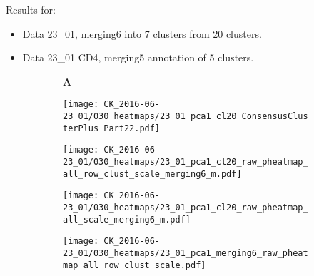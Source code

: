 \documentclass[a4paper, 12pt]{article}
\begin{document}
\pagestyle{empty}

Results for:
\begin{itemize}
  \item Data 23\_01, merging6 into 7 clusters from 20 clusters. 
  \item Data 23\_01 CD4, merging5 annotation of 5 clusters.
\end{itemize}


\begin{figure}[!thb]
\centering

    \caption{Data 23\_01, merging6 - 7 clusters}
    \begin{subfigure}[t]{0.02\textwidth}
    \vskip 0pt
        \textbf{\textsf{\normalsize A}}
    \end{subfigure}
    \begin{subfigure}[t]{0.45\textwidth}
    \vskip 0pt
    \caption{}
        \texttt{[image: CK\_2016-06-23\_01/030\_heatmaps/23\_01\_pca1\_cl20\_ConsensusClusterPlus\_Part22.pdf]}
    \end{subfigure}
    

\end{figure}

\begin{figure}[!thb]
\centering

    \caption{}
    \begin{subfigure}[t]{0.02\textwidth}
    \vskip 0pt
        \textbf{\textsf{\normalsize }}
    \end{subfigure}
    \begin{subfigure}[t]{0.9\textwidth}
    \vskip 0pt
    \caption{}
        \texttt{[image: CK\_2016-06-23\_01/030\_heatmaps/23\_01\_pca1\_cl20\_raw\_pheatmap\_all\_row\_clust\_scale\_merging6\_m.pdf]}
    \end{subfigure}
    
    \caption{}
    \begin{subfigure}[t]{0.02\textwidth}
    \vskip 0pt
        \textbf{\textsf{\normalsize }}
    \end{subfigure}
    \begin{subfigure}[t]{0.9\textwidth}
    \vskip 0pt
    \caption{}
        \texttt{[image: CK\_2016-06-23\_01/030\_heatmaps/23\_01\_pca1\_cl20\_raw\_pheatmap\_all\_scale\_merging6\_m.pdf]}
    \end{subfigure}
    
    \caption{}
    \begin{subfigure}[t]{0.02\textwidth}
    \vskip 0pt
        \textbf{\textsf{\normalsize }}
    \end{subfigure}
    \begin{subfigure}[t]{0.9\textwidth}
    \vskip 0pt
    \caption{}
        \texttt{[image: CK\_2016-06-23\_01/030\_heatmaps/23\_01\_pca1\_merging6\_raw\_pheatmap\_all\_row\_clust\_scale.pdf]}
    \end{subfigure}

\end{figure}
\end{document}
